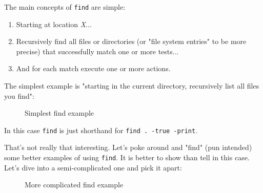 \documentclass[10pt,american,]{book}
\newenvironment{Shaded}{\begin{snugshade}}{\end{snugshade}}
\newcommand{\KeywordTok}[1]{\textcolor[rgb]{0.13,0.29,0.53}{\textbf{{#1}}}}
\newcommand{\NormalTok}[1]{{#1}}
\numberwithin{figure}{chapter}
\DeclareRobustCommand{\drcap}[1]{\begin{figure}[H]\caption{#1}\end{figure}}
\renewcommand{\KeywordTok}[1]{{#1}}
\renewcommand{\NormalTok}[1]{{#1}}
\begin{document}
The main concepts of \texttt{find} are simple:

\begin{enumerate}
\def\labelenumi{\arabic{enumi}.}
\item
  Starting at location \emph{X}...
\item
  Recursively find all files or directories (or "file system entries" to
  be more precise) that successfully match one or more tests...
\item
  And for each match execute one or more actions.
\end{enumerate}

The simplest example is "starting in the current directory, recursively
list all files you find":

\drcap{Simplest find example}

\begin{Shaded}
\end{Shaded}

In this case \texttt{find} is just shorthand for
\texttt{find\ .\ -true\ -print}.

That's not really that interesting. Let's poke around and "find" (pun
intended) some better examples of using \texttt{find}. It is better to
show than tell in this case. Let's dive into a semi-complicated one and
pick it apart:

\drcap{More complicated find example}
\end{document}
